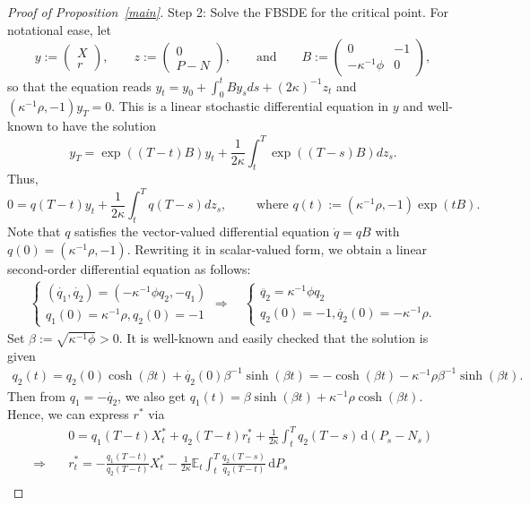\documentclass[openany,oneside]{article}
\theoremstyle{definition}
\theoremstyle{remark}
\newcommand{\E}{\mathbb{E}} %
\newcommand{\ts}{\textstyle}
\newcommand{\de}{\,\mathrm{d}}
\begin{document}
\begin{proof}[Proof of Proposition~\ref{main}]
Step 2: Solve the FBSDE for the critical point. For notational ease, let
\[
 y:=\begin{pmatrix} X \\ r\end{pmatrix},\qquad z:=\begin{pmatrix} 0 \\ P-N\end{pmatrix},\qquad\text{and}\qquad B:=\begin{pmatrix} 0 & -1 \\ -\kappa^{-1}\phi & 0\end{pmatrix},
\]
so that the equation reads $y_t = y_0 + \int_0^t B y_s ds + (2\kappa)^{-1}z_t$ and $(\kappa^{-1}\rho, -1)y_T = 0$. This is a linear stochastic differential equation in $y$ and well-known to have the solution
\[
\ts y_T = \exp((T-t)B)y_t + \frac{1}{2\kappa} \int_t^T \exp((T-s)B) dz_s.
\]
Thus,
\[
\ts 0 = q(T-t)y_t + \frac{1}{2\kappa}\int_t^T q(T-s) dz_s,\qquad \textrm{ where } q(t):=(\kappa^{-1}\rho, -1)\exp(tB).
\]
Note that $q$ satisfies the vector-valued differential equation $\dot{q}=qB$ with $q(0)=(\kappa^{-1}\rho, -1)$. Rewriting it in scalar-valued form, we obtain a linear second-order differential equation as follows:
\begin{align*}
\begin{cases} (\dot{q_1},\dot{q_2})=(-\kappa^{-1}\phi q_2, -q_1) \\ q_1(0)=\kappa^{-1}\rho, q_2(0)=-1 \end{cases}
\Rightarrow\quad \begin{cases}
\ddot{q_2}=\kappa^{-1}\phi q_2 \\ q_2(0)=-1, \dot{q_2}(0)=-\kappa^{-1}\rho.
\end{cases}
\end{align*}
Set $\beta:=\sqrt{\kappa^{-1}\phi}>0$. It is well-known and easily checked that the solution is given%
\begin{align*}
q_2(t)=q_2(0)\cosh(\beta t)+\dot{q_2}(0)\beta^{-1}\sinh(\beta t) = -\cosh(\beta t)-\kappa^{-1}\rho\beta^{-1}\sinh(\beta t).
\end{align*}
Then from $q_1=-\dot{q_2}$, we also get $q_1(t)=\beta\sinh(\beta t)+\kappa^{-1}\rho\cosh(\beta t)$. Hence, we can express $r^\ast$ via
\begin{align*}
&\ts 0=q_1(T-t)X^\ast_t+q_2(T-t)r^\ast_t+\frac{1}{2\kappa}\int_t^T q_2(T-s) \de (P_s-N_s) \\
\Rightarrow\quad &\ts r^\ast_t = -\frac{q_1(T-t)}{q_2(T-t)} X^\ast_t - \frac{1}{2\kappa} \E_t\int_t^T\frac{q_2(T-s)}{q_2(T-t)} \de P_s \\

\end{align*}
\end{proof}
\end{document}
